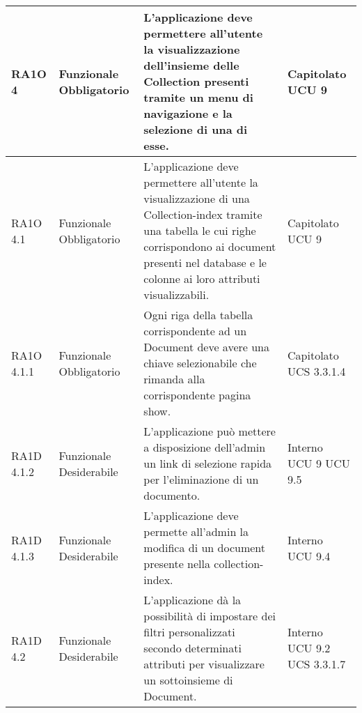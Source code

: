 \begin{center}
\begin{longtable}{ | l | p{2cm} | p{5cm} | p{1.7cm} |}
        RA1O 4 & Funzionale \newline  Obbligatorio  & L'applicazione deve permettere all'utente la visualizzazione dell'insieme delle Collection presenti tramite un menu di navigazione e la selezione di una di esse. &  Capitolato \newline  UCU 9 \newline  \\ \hline      
        RA1O 4.1 & Funzionale \newline  Obbligatorio  & L'applicazione deve permettere all'utente la visualizzazione di una Collection-index tramite una tabella le cui righe corrispondono ai document presenti nel database e le colonne ai loro attributi visualizzabili. &  Capitolato \newline  UCU 9 \newline  \\ \hline      
        RA1O 4.1.1 & Funzionale \newline  Obbligatorio  & Ogni riga della tabella corrispondente ad un Document deve avere una chiave selezionabile che rimanda alla corrispondente pagina show. &  Capitolato \newline  UCS 3.3.1.4 \newline  \\ \hline      
        RA1D 4.1.2 & Funzionale \newline  Desiderabile  & L’applicazione può mettere a disposizione dell’admin un link di selezione rapida per l’eliminazione di un documento. &  Interno \newline  UCU 9 \newline  UCU 9.5 \newline  \\ \hline      
        RA1D 4.1.3 & Funzionale \newline  Desiderabile  & L’applicazione deve permette all’admin la modifica di un document presente nella collection-index. &  Interno \newline  UCU 9.4 \newline  \\ \hline      
        RA1D 4.2 & Funzionale \newline  Desiderabile  & L’applicazione dà la possibilità di impostare dei filtri personalizzati secondo determinati attributi per visualizzare un sottoinsieme di Document. &  Interno \newline  UCU 9.2 \newline  UCS 3.3.1.7 \newline  \\ \hline      

\end{longtable}
\end{center}
